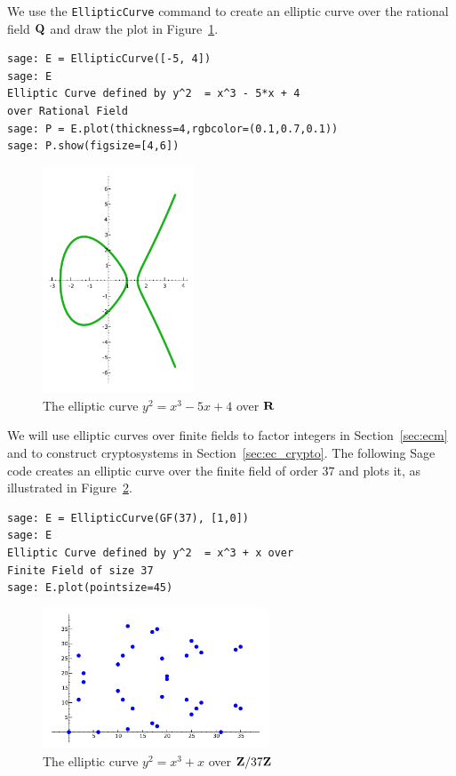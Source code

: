 \begin{sg}
We use the {\tt EllipticCurve} command
to create an elliptic curve over the rational field $\mathbf{Q}$
and draw the plot in Figure~\ref{fig:ecQ}.
\begin{verbatim}
sage: E = EllipticCurve([-5, 4])
sage: E
Elliptic Curve defined by y^2  = x^3 - 5*x + 4
over Rational Field
sage: P = E.plot(thickness=4,rgbcolor=(0.1,0.7,0.1))
sage: P.show(figsize=[4,6])
\end{verbatim}
\begin{figure}
\begin{center}
\includegraphics[width=0.4\textwidth]{graphics/eQ}
\caption{The elliptic curve $y^2  = x^3 - 5x + 4$ over $\mathbf{R}$\label{fig:ecQ}}
\end{center}
\end{figure}


We will use elliptic curves over finite fields to factor integers in
Section~\ref{sec:ecm} and to construct cryptosystems in
Section~\ref{sec:ec_crypto}.  The following Sage code creates an
elliptic curve over the finite field of order $37$ and plots it, as
illustrated in Figure~\ref{fig:ecf37}.
\newpage
\begin{verbatim}
sage: E = EllipticCurve(GF(37), [1,0])
sage: E
Elliptic Curve defined by y^2  = x^3 + x over
Finite Field of size 37
sage: E.plot(pointsize=45)
\end{verbatim}
\end{sg}

\begin{figure}[ht]
\begin{center}
\includegraphics[width=0.6\textwidth]{graphics/E_gf37}
\caption{The elliptic curve $y^2 = x^3 + x$ over $\mathbf{Z}/37\mathbf{Z}{}$\label{fig:ecf37}}
\end{center}
\end{figure}


